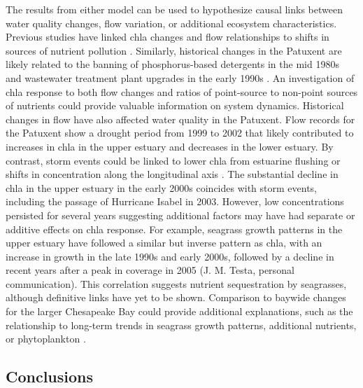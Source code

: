 \documentclass{svjour3}\usepackage[]{graphicx}\usepackage[]{color}
\begin{document}
The results from either model can be used to hypothesize causal links between water quality changes, flow variation, or additional ecosystem characteristics.  Previous studies have linked \ac{chla} changes and flow relationships to shifts in sources of nutrient pollution \cite{Hirsch10,Beck15}.  Similarly, historical changes in the Patuxent are likely related to the banning of phosphorus-based detergents in the mid 1980s and wastewater treatment plant upgrades in the early 1990s \cite{Lung03,Testa08a}.  An investigation of \ac{chla} response to both flow changes and ratios of point-source to non-point sources of nutrients could provide valuable information on system dynamics.  Historical changes in flow have also affected water quality in the Patuxent.  Flow records for the Patuxent show a drought period from 1999 to 2002 that likely contributed to increases in \ac{chla} in the upper estuary and decreases in the lower estuary.  By contrast, storm events could be linked to lower \ac{chla} from estuarine flushing or shifts in concentration along the longitudinal axis \cite{Hagy06,Murrell07}.  The substantial decline in \ac{chla} in the upper estuary in the early 2000s coincides with storm events, including the passage of Hurricane Isabel in 2003.  However, low concentrations persisted for several years suggesting additional factors may have had separate or additive effects on \ac{chla} response.  For example, seagrass growth patterns in the upper estuary have followed a similar but inverse pattern as \ac{chla}, with an increase in growth in the late 1990s and early 2000s, followed by a decline in recent years after a peak in coverage in 2005 (J. M. Testa, personal communication).  This correlation suggests nutrient sequestration by seagrasses, although definitive links have yet to be shown.  Comparison to baywide changes for the larger Chesapeake Bay could provide additional explanations, such as the relationship to long-term trends in seagrass growth patterns, additional nutrients, or phytoplankton \cite{Orth10,Harding16}.    

\subsection{Conclusions}
\end{document}
